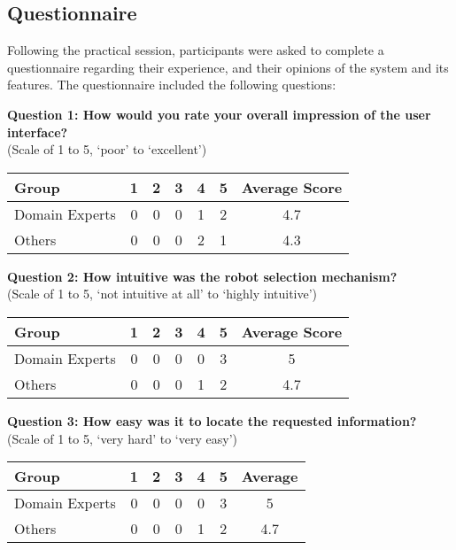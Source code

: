 \subsection{Questionnaire}
Following the practical session, participants were asked to complete a questionnaire regarding their experience, and their opinions of the system and its features. The questionnaire included the following questions:

\noindent\textbf{Question 1: How would you rate your overall impression of the user interface?}\\(Scale of 1 to 5, `poor' to `excellent')

\begin{center}
\begin{tabular}{ l c c c c c c }
 Group & 1 & 2 & 3 & 4 & 5 & Average Score \\ 
 \hline
 Domain Experts & 0 & 0 & 0 & 1 & 2 & 4.7 \\
 Others 		& 0 & 0 & 0 & 2 & 1 & 4.3 \\
\end{tabular}
\end{center}

\noindent\textbf{Question 2: How intuitive was the robot selection mechanism?}\\(Scale of 1 to 5, `not intuitive at all' to `highly intuitive')

\begin{center}
\begin{tabular}{ l c c c c c c }
 Group & 1 & 2 & 3 & 4 & 5 & Average Score \\ 
 \hline
 Domain Experts & 0 & 0 & 0 & 0 & 3 & 5 \\
 Others 		& 0 & 0 & 0 & 1 & 2 & 4.7 \\
\end{tabular}
\end{center}

\noindent\textbf{Question 3: How easy was it to locate the requested information?}\\(Scale of 1 to 5, `very hard' to `very easy')

\begin{center}
\begin{tabular}{ l c c c c c c }
 Group & 1 & 2 & 3 & 4 & 5 & Average \\ 
 \hline
 Domain Experts & 0 & 0 & 0 & 0 & 3 & 5 \\
 Others 		& 0 & 0 & 0 & 1 & 2 & 4.7 \\
\end{tabular}
\end{center}

